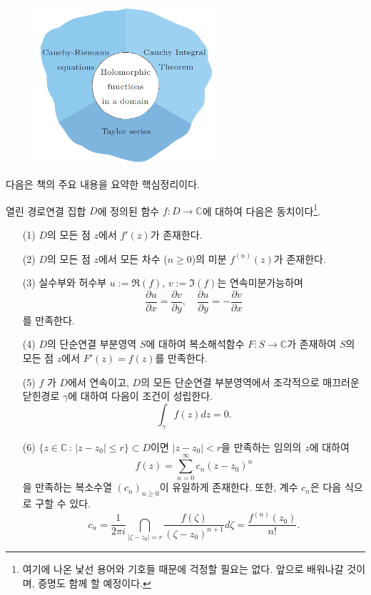 \begin{figure}[!h]
\begin{center}
\includegraphics[width=0.6\textwidth]{./SaltChapter/figs/preface-fig-0-4}
\end{center}
\end{figure}

다음은 책의 주요 내용을 요약한 핵심정리이다.

\begin{salttheorem}{}{} \label{thm-0-2}
열린 경로연결 집합 $D$에 정의된 함수
$f:D\to \mathbb C$에 대하여 다음은 
동치이다\footnote{여기에 나온 낯선 용어와 기호들 때문에 걱정할 필요는 없다.
앞으로 배워나갈 것이며, 증명도 함께 할 예정이다.}.
\begin{itemize}
\item[(1)] $D$의 모든 점 $z$에서 $f'(z)$가 존재한다.
\item[(2)] $D$의 모든 점 $z$에서 모든 차수 ($n\ge0$)의 미분  $f^{(n)}(z)$가 존재한다.
\item[(3)] 실수부와 허수부 $u:=\Re(f)$, $v:=\Im(f)$는 연속미분가능하며 
$$
\frac{\partial u}{\partial x} = \frac{\partial v}{\partial y},
\quad
\frac{\partial u}{\partial y} = - \frac{\partial v}{\partial x}
$$
를 만족한다.
\item[(4)] $D$의 단순연결 부분영역 $S$에 대하여 
복소해석함수 $ F: S\to \mathbb C$가 존재하여
$S$의 모든 점 $z$에서 $F'(z)= f(z)$를 만족한다.
\item[(5)] $ f$ 가 $D$에서 연속이고, 
$D$의 모든 단순연결 부분영역에서
조각적으로 매끄러운 닫힌경로 $\gamma$에 대하여 다음이 조건이 성립한다.
$$
\int_\gamma f(z)dz = 0.
$$
\item[(6)] $\{ z\in \mathbb C\,:\, |z-z_0| \le r \} \subset D$이면
$|z-z_0|<r$을 만족하는 임의의 $z$에 대하여
$$
f(z) = \sum_{n=0}^\infty c_n(z-z_0)^n
$$
을 만족하는 복소수열 $(c_n)_{n\ge0}$이 유일하게 존재한다.
또한, 계수 $c_n$은 다음 식으로 구할 수 있다.
$$
c_n = \dfrac1{2\pi i} \dint_{|\zeta-z_0|=r} \frac{f(\zeta)}{(\zeta-z_0)^{n+1}}d\zeta = \dfrac{f^{(n)}(z_0)}{n!}.
$$
\end{itemize}
\end{salttheorem}

